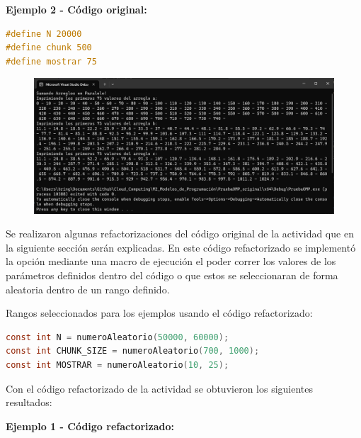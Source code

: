 \documentclass[12pt,a4paper]{article}
\begin{document}
\textbf{Ejemplo 2 - Código original:}

\begin{lstlisting}[language=C, numbers=none]
#define N 20000
#define chunk 500
#define mostrar 75
\end{lstlisting}

\begin{figure}[H]
    \centering
    \includegraphics[width=1\linewidth]{M2_Modelos_de_Programación/reporte/figuras/Código_original_ejemplo-2.png}
    \label{fig:Código_original_ejemplo-2}
\end{figure}

Se realizaron algunas refactorizaciones del código original de la actividad que en la siguiente sección serán explicadas. En este código refactorizado se implementó la opción mediante una macro de ejecución el poder correr los valores de los parámetros definidos dentro del código o que estos se seleccionaran de forma aleatoria dentro de un rango definido.

\vspace{1em}

Rangos seleccionados para los ejemplos usando el código refactorizado:

\begin{lstlisting}[language=C, numbers=none]
const int N = numeroAleatorio(50000, 60000);
const int CHUNK_SIZE = numeroAleatorio(700, 1000);
const int MOSTRAR = numeroAleatorio(10, 25);
\end{lstlisting}

\vspace{1em}

Con el código refactorizado de la actividad se obtuvieron los siguientes resultados:

\vspace{1em}

\textbf{Ejemplo 1 - Código refactorizado:}
\end{document}
